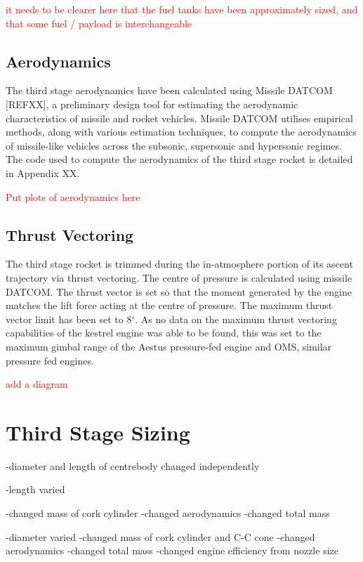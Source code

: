 		\textcolor{red}{it needs to be clearer here that the fuel tanks have been approximately sized, and that some fuel / payload is interchangeable}
		
		
		
		
		\subsection{Aerodynamics}
		
		The third stage aerodynamics have been calculated using Missile DATCOM [REFXX], a preliminary design tool for estimating the aerodynamic characteristics of missile and rocket vehicles. Missile DATCOM utilises empirical methods, along with various estimation techniques, to compute the aerodynamics of missile-like vehicles across the subsonic, supersonic and hypersonic regimes.  The code used to compute the aerodynamics of the third stage rocket is detailed in Appendix XX.  
		
		\textcolor{red}{Put plots of aerodynamics here}
		
		\subsection{Thrust Vectoring}
		
		The third stage rocket is trimmed during the in-atmosphere portion of its ascent trajectory via thrust vectoring. The centre of pressure is calculated using missile DATCOM. The thrust vector is set so that the moment generated by the engine matches the lift force acting at the centre of pressure. The maximum thrust vector limit has been set to 8$^\circ$. As no data on the maximum thrust vectoring capabilities of the kestrel engine was able to be found, this was set to the maximum gimbal range of the Aestus pressure-fed engine and OMS, similar pressure fed engines. 
		
		\textcolor{red}{add a diagram}
		
\section{Third Stage Sizing}

-diameter and length of centrebody changed independently

-length varied

	-changed mass of cork cylinder
	-changed aerodynamics
	-changed total mass

-diameter varied
	-changed mass of cork cylinder and C-C cone
	-changed aerodynamics
	-changed total mass
	-changed engine efficiency from nozzle size
		